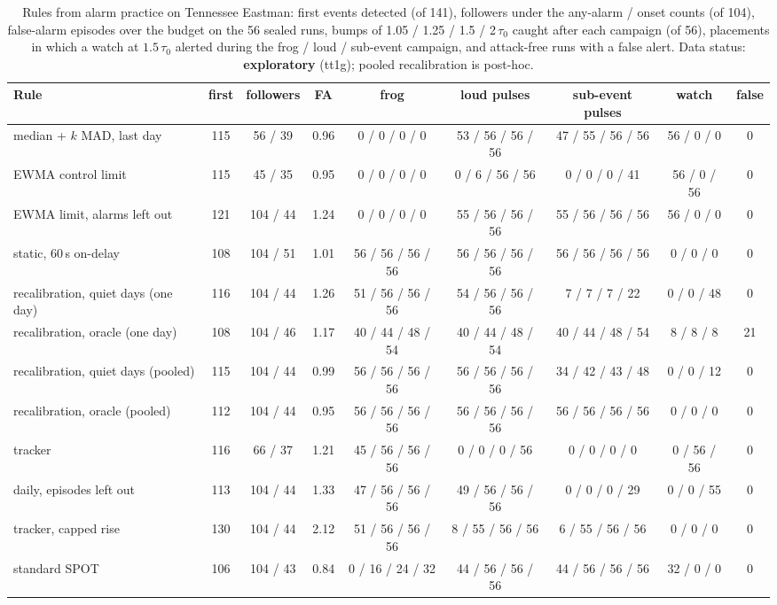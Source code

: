 \documentclass[sigconf,review,anonymous]{acmart}
\begin{document}
\begin{table}[t]
\caption{Rules from alarm practice on Tennessee Eastman: first events detected (of 141), followers
under the any-alarm / onset counts (of 104), false-alarm episodes over the budget on the 56 sealed runs,
bumps of 1.05 / 1.25 / 1.5 / 2\,$\tau_0$ caught after each campaign (of 56), placements in which a watch at
$1.5\,\tau_0$ alerted during the frog / loud / sub-event campaign, and attack-free runs with a false
alert. Data status: \textbf{exploratory} (tt1g); pooled recalibration is post-hoc.}
\label{tab:practice}
\small
\begin{tabularx}{\textwidth}{@{}Lcccccccc@{}}
\toprule
Rule & first & followers & FA & frog & loud pulses & sub-event pulses & watch & false \\
\midrule
median + $k$ MAD, last day & 115 & 56 / 39 & 0.96 & 0 / 0 / 0 / 0 & 53 / 56 / 56 / 56 & 47 / 55 / 56 / 56 & 56 / 0 / 0 & 0 \\
EWMA control limit & 115 & 45 / 35 & 0.95 & 0 / 0 / 0 / 0 & 0 / 6 / 56 / 56 & 0 / 0 / 0 / 41 & 56 / 0 / 56 & 0 \\
EWMA limit, alarms left out & 121 & 104 / 44 & 1.24 & 0 / 0 / 0 / 0 & 55 / 56 / 56 / 56 & 55 / 56 / 56 / 56 & 56 / 0 / 0 & 0 \\
static, 60\,s on-delay & 108 & 104 / 51 & 1.01 & 56 / 56 / 56 / 56 & 56 / 56 / 56 / 56 & 56 / 56 / 56 / 56 & 0 / 0 / 0 & 0 \\
recalibration, quiet days (one day) & 116 & 104 / 44 & 1.26 & 51 / 56 / 56 / 56 & 54 / 56 / 56 / 56 & 7 / 7 / 7 / 22 & 0 / 0 / 48 & 0 \\
recalibration, oracle (one day) & 108 & 104 / 46 & 1.17 & 40 / 44 / 48 / 54 & 40 / 44 / 48 / 54 & 40 / 44 / 48 / 54 & 8 / 8 / 8 & 21 \\
recalibration, quiet days (pooled) & 115 & 104 / 44 & 0.99 & 56 / 56 / 56 / 56 & 56 / 56 / 56 / 56 & 34 / 42 / 43 / 48 & 0 / 0 / 12 & 0 \\
recalibration, oracle (pooled) & 112 & 104 / 44 & 0.95 & 56 / 56 / 56 / 56 & 56 / 56 / 56 / 56 & 56 / 56 / 56 / 56 & 0 / 0 / 0 & 0 \\
tracker & 116 & 66 / 37 & 1.21 & 45 / 56 / 56 / 56 & 0 / 0 / 0 / 56 & 0 / 0 / 0 / 0 & 0 / 56 / 56 & 0 \\
daily, episodes left out & 113 & 104 / 44 & 1.33 & 47 / 56 / 56 / 56 & 49 / 56 / 56 / 56 & 0 / 0 / 0 / 29 & 0 / 0 / 55 & 0 \\
tracker, capped rise & 130 & 104 / 44 & 2.12 & 51 / 56 / 56 / 56 & 8 / 55 / 56 / 56 & 6 / 55 / 56 / 56 & 0 / 0 / 0 & 0 \\
standard SPOT & 106 & 104 / 43 & 0.84 & 0 / 16 / 24 / 32 & 44 / 56 / 56 / 56 & 44 / 56 / 56 / 56 & 32 / 0 / 0 & 0 \\
\bottomrule
\end{tabularx}
\end{table}
\end{document}
